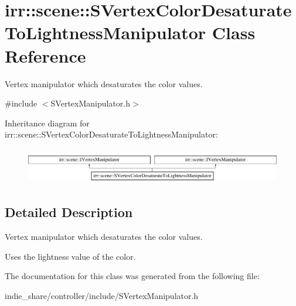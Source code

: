 \hypertarget{classirr_1_1scene_1_1SVertexColorDesaturateToLightnessManipulator}{}\section{irr\+:\+:scene\+:\+:S\+Vertex\+Color\+Desaturate\+To\+Lightness\+Manipulator Class Reference}
\label{classirr_1_1scene_1_1SVertexColorDesaturateToLightnessManipulator}


Vertex manipulator which desaturates the color values.  




{\ttfamily \#include $<$S\+Vertex\+Manipulator.\+h$>$}

Inheritance diagram for irr\+:\+:scene\+:\+:S\+Vertex\+Color\+Desaturate\+To\+Lightness\+Manipulator\+:\begin{figure}[H]
\begin{center}
\leavevmode
\includegraphics[height=1.600000cm]{classirr_1_1scene_1_1SVertexColorDesaturateToLightnessManipulator}
\end{center}
\end{figure}


\subsection{Detailed Description}
Vertex manipulator which desaturates the color values. 

Uses the lightness value of the color. 

The documentation for this class was generated from the following file\+:\begin{DoxyCompactItemize}
\item 
indie\+\_\+share/controller/include/S\+Vertex\+Manipulator.\+h\end{DoxyCompactItemize}
